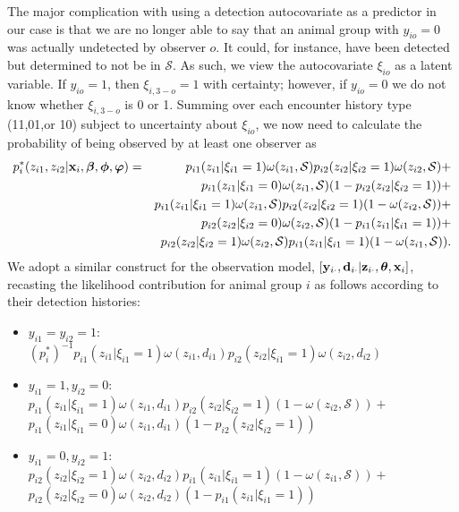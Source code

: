 \documentclass[aoas,preprint]{imsart}
\numberwithin{equation}{section}
\theoremstyle{plain}
\begin{document}
The major complication with using a detection autocovariate as a predictor in our case is that we are no longer able to say that an animal group with $y_{io}=0$ was actually undetected by observer $o$.  It could, for instance, have been detected but determined to not be in $\mathcal{S}$.  As such, we view the autocovariate $\xi_{io}$ as a latent variable.  If $y_{io}=1$, then $\xi_{i,3-o}=1$ with certainty; however, if $y_{io}=0$ we do not know whether $\xi_{i,3-o}$ is 0 or 1. Summing over each encounter history type (11,01,or 10) subject to uncertainty about $\xi_{io}$, we now need to calculate the probability of being observed by at least one observer as
\begin{eqnarray*}
  \label{eq:pstar2}
  p_i^*(z_{i1},z_{i2}|{\bf x}_i,\boldsymbol{\beta},\boldsymbol{\phi},\boldsymbol{\varphi}) & = &
  p_{i1}(z_{i1}|\xi_{i1}=1) \omega(z_{i1},\mathcal{S}) p_{i2}(z_{i2}|\xi_{i2}=1) \omega(z_{i2},\mathcal{S}) + \\
   & & p_{i1}(z_{i1}|\xi_{i1}=0)\omega(z_{i1},\mathcal{S})(1-p_{i2}(z_{i2}|\xi_{i2}=1)) + \nonumber \\ & &
   p_{i1}(z_{i1}|\xi_{i1}=1)\omega(z_{i1},\mathcal{S})p_{i2}(z_{i2}|\xi_{i2}=1)(1-\omega(z_{i2},\mathcal{S}))
   + \nonumber \\ & &
    p_{i2}(z_{i2}|\xi_{i2}=0)\omega(z_{i2},\mathcal{S})(1-p_{i1}(z_{i1}|\xi_{i1}=1)) + \nonumber \\ & &
   p_{i2}(z_{i2}|\xi_{i2}=1)\omega(z_{i2},\mathcal{S})p_{i1}(z_{i1}|\xi_{i1}=1)(1-\omega(z_{i1},\mathcal{S})).
   \nonumber
\end{eqnarray*}
We adopt a similar construct for the observation model, $[{\bf y}_{i \cdot},{\bf d}_{i \cdot}|{\bf z}_{i \cdot} , \boldsymbol{\theta} , {\bf x}_i]$, recasting the likelihood contribution for animal group $i$ as follows according to their detection histories:
\begin{itemize}
  \item \underline{$y_{i1}=y_{i2}=1$}: \\
   $(p_i^*)^{-1}
    p_{i1}(z_{i1}|\xi_{i1}=1) \omega(z_{i1},d_{i1}) p_{i2}(z_{i2}|\xi_{i1}=1) \omega(z_{i2},d_{i2})$
  \item \underline{$y_{i1}=1, y_{i2}=0$}: \\
   $p_{i1}(z_{i1}|\xi_{i1}=1)\omega(z_{i1},d_{i1})
    p_{i2}(z_{i2}|\xi_{i2}=1)(1-\omega(z_{i2},\mathcal{S}))+ $ \\
    $p_{i1}(z_{i1}|\xi_{i1}=0)\omega(z_{i1},d_{i1})(1-p_{i2}(z_{i2}|\xi_{i2}=1))$
  \item \underline{$y_{i1}=0, y_{i2}=1$}: \\
    $p_{i2}(z_{i2}|\xi_{i2}=1)\omega(z_{i2},d_{i2})
    p_{i1}(z_{i1}|\xi_{i1}=1)(1-\omega(z_{i1},\mathcal{S}))+$ \\
    $p_{i2}(z_{i2}|\xi_{i2}=0)\omega(z_{i2},d_{i2})(1-p_{i1}(z_{i1}|\xi_{i1}=1))$
\end{itemize}
\end{document}
